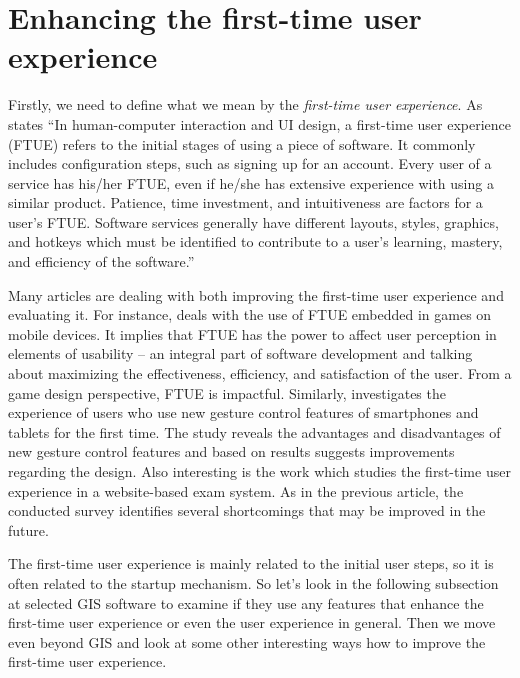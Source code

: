 \documentclass[a4paper,10pt,twoside]{article}
\begin{document}
\newpage
\vspace*{-1cm}
\section{Enhancing the first-time user experience}
\label{subsection:enhancing}

Firstly, we need to define what we mean by the \textit{first-time user
  experience}. As \cite{ftue} states ``In human-computer interaction
and UI design, a first-time user experience (FTUE) refers to the
initial stages of using a piece of software. It commonly includes
configuration steps, such as signing up for an account. Every user of
a service has his/her FTUE, even if he/she has extensive experience
with using a similar product. Patience, time investment, and
intuitiveness are factors for a user's FTUE. Software services
generally have different layouts, styles, graphics, and hotkeys which
must be identified to contribute to a user's learning, mastery, and
efficiency of the software.''

Many articles are dealing with both improving the first-time user
experience and evaluating it. For instance, \cite{BARNETT201882} deals
with the use of FTUE embedded in games on mobile devices. It implies
that FTUE has the power to affect user perception in elements of
usability -- an integral part of software development and talking
about maximizing the effectiveness, efficiency, and satisfaction of
the user. From a game design perspective, FTUE is
impactful. Similarly, \cite{smartphones} investigates the experience
of users who use new gesture control features of smartphones and
tablets for the first time. The study reveals the advantages and
disadvantages of new gesture control features and based on results
suggests improvements regarding the design. Also interesting is the
work \cite{onlineexamination} which studies the first-time user
experience in a website-based exam system. As in the previous article,
the conducted survey identifies several shortcomings that may be
improved in the future.

The first-time user experience is mainly related to the initial user
steps, so it is often related to the startup mechanism. So let's look
in the following subsection at selected GIS software to examine if
they use any features that enhance the first-time user experience or
even the user experience in general. Then we move even beyond GIS and
look at some other interesting ways how to improve the first-time user
experience.
\end{document}
